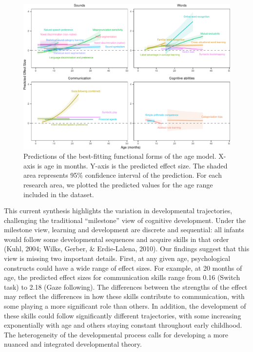 \documentclass[10pt, letterpaper]{article}
\newenvironment{CodeChunk}{}{}
\begin{document}
\begin{CodeChunk}
\begin{figure}[h!]

{\centering \includegraphics{figs/2-col-imageb-1} 

}

\caption[Predictions of the best-fitting functional forms of the age model]{Predictions of the best-fitting functional forms of the age model. X-axis is age in months. Y-axis is the predicted effect size. The shaded area represents 95\% confidence interval of the prediction. For each research area, we plotted the predicted values for the age range included in the dataset.}\label{fig:2-col-imageb}
\end{figure}
\end{CodeChunk}

This current synthesis highlights the variation in developmental
trajectories, challenging the traditional ``milestone'' view of
cognitive development. Under the milestone view, learning and
development are discrete and sequential: all infants would follow some
developmental sequences and acquire skills in that order (Kuhl, 2004;
Wilks, Gerber, \& Erdie-Lalena, 2010). Our findings suggest that this
view is missing two important details. First, at any given age,
psychological constructs could have a wide range of effect sizes. For
example, at 20 months of age, the predicted effect sizes for
communication skills range from 0.16 (Switch task) to 2.18 (Gaze
following). The differences between the strengths of the effect may
reflect the differences in how these skills contribute to communication,
with some playing a more significant role than others. In addition, the
development of these skills could follow significantly different
trajectories, with some increasing exponentially with age and others
staying constant throughout early childhood. The heterogeneity of the
developmental process calls for developing a more nuanced and integrated
developmental theory.
\end{document}
